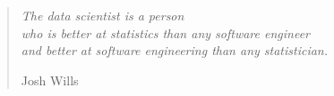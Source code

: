 \documentclass[a4paper, nobind]{templates/ociamthesis}
\theoremstyle{definition}
\theoremstyle{definition}
\theoremstyle{definition}
\theoremstyle{remark}
\begin{document}
\begin{romanpages}



\begin{frontespizio}
  \begin{Preambolo*}
    \renewcommand {\frontinstitutionfont } {\fontsize {20}{21}\bfseries }
    \renewcommand {\frontdivisionfont } {\fontsize {16}{23}\normalfont }
    \renewcommand {\frontpretitlefont } {\fontsize {16}{23}\scshape }
    \renewcommand {\fronttitlefont } {\fontsize {24}{27}\bfseries }
    \renewcommand {\frontfixednamesfont} {\fontsize {16}{23}\normalfont }
    \renewcommand {\frontnamesfont} {\fontsize {16}{23}\bfseries }
    \renewcommand {\frontfootfont} {\fontsize {14}{20}\bfseries }
  \end{Preambolo*}
  
\end{frontespizio}




\null\newpage


  \begin{quote}
    \begin{flushright}
      \textit{The data scientist is a person\\
who is better at statistics than any software engineer\\
and better at software engineering than any statistician.}
    
      Josh Wills
    \end{flushright}
  \end{quote}



\end{romanpages}
\end{document}
